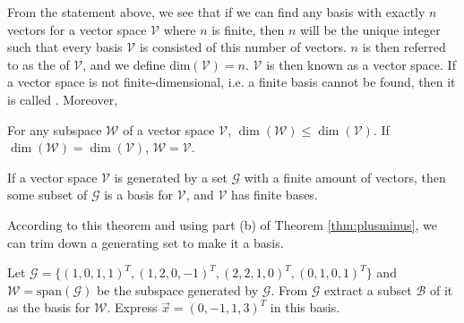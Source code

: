 From the statement above, we see that if we can find any basis with exactly $n$ vectors for a vector space $\mathcal{V}$ where $n$ is finite, then $n$ will be the unique integer such that every basis $\mathcal{V}$ is consisted of this number of vectors. $n$ is then referred to as the  of $\mathcal{V}$, and we define $\text{dim}(\mathcal{V}) = n$. $\mathcal{V}$ is then known as a  vector space. If a vector space is not finite-dimensional, i.e. a finite basis cannot be found, then it is called . Moreover,
\begin{proper}
\label{proper:dimWleqV}
For any subspace $\mathcal{W}$ of a vector space $\mathcal{V}$, $\dim(\mathcal{W}) \leq \dim(\mathcal{V})$. If $\dim(\mathcal{W}) = \dim(\mathcal{V})$, $\mathcal{W} = \mathcal{V}$.
\end{proper}
\begin{thm}
\label{thm:finitebasissubset}
If a vector space $\mathcal{V}$ is generated by a set $\mathcal{G}$ with a finite amount of vectors, then some subset of $\mathcal{G}$ is a basis for $\mathcal{V}$, and $\mathcal{V}$ has finite bases.
\end{thm}
According to this theorem and using part (b) of Theorem \ref{thm:plusminus}, we can trim down a generating set to make it a basis.
\begin{exmp}
\label{exmp:gentrimbasis}
Let $\mathcal{G} = \{(1,0,1,1)^T, (1,2,0,-1)^T, (2,2,1,0)^T, (0,1,0,1)^T\}$ and $\mathcal{W} = \text{span}(\mathcal{G})$ be the subspace generated by $\mathcal{G}$. From $\mathcal{G}$ extract a subset $\mathcal{B}$ of it as the basis for $\mathcal{W}$. Express $\vec{x} = (0,-1,1,3)^T$ in this basis.
\end{exmp}
